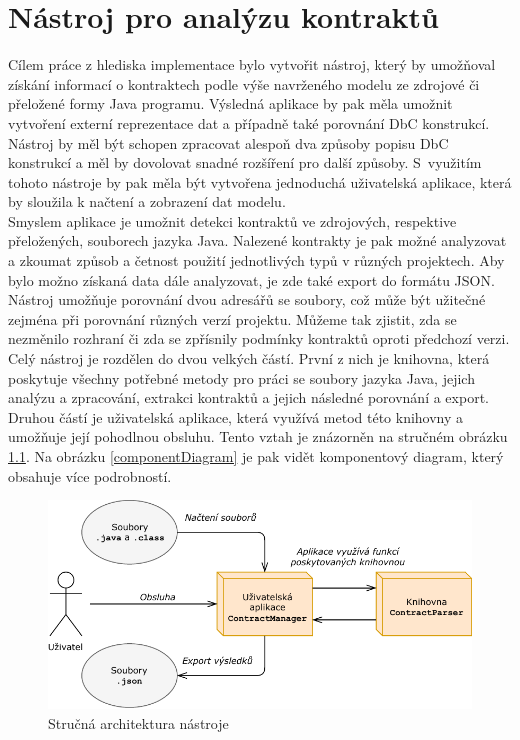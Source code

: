 \chapter{Nástroj pro analýzu kontraktů}
	Cílem práce z hlediska implementace bylo vytvořit nástroj, který by umožňoval získání informací o kontraktech podle výše navrženého modelu ze zdrojové či přeložené formy Java programu. Výsledná aplikace by pak měla umožnit vytvoření externí reprezentace dat a případně také porovnání DbC konstrukcí. Nástroj by měl být schopen zpracovat alespoň dva způsoby popisu DbC konstrukcí a měl by dovolovat snadné rozšíření pro další způsoby. S~využitím tohoto nástroje by pak měla být vytvořena jednoduchá uživatelská aplikace, která by sloužila k načtení a zobrazení dat modelu.\\
	
	Smyslem aplikace je umožnit detekci kontraktů ve zdrojových, respektive přeložených, souborech jazyka Java. Nalezené kontrakty je pak možné analyzovat a zkoumat způsob a četnost použití jednotlivých typů v různých projektech. Aby bylo možno získaná data dále analyzovat, je zde také export do formátu JSON. Nástroj umožňuje porovnání dvou adresářů se soubory, což může být užitečné zejména při porovnání různých verzí projektu. Můžeme tak zjistit, zda se nezměnilo rozhraní či zda se zpřísnily podmínky kontraktů oproti předchozí verzi.\\
	
	Celý nástroj je rozdělen do dvou velkých částí. První z nich je knihovna, která poskytuje všechny potřebné metody pro práci se soubory jazyka Java, jejich analýzu a zpracování, extrakci kontraktů a jejich následné porovnání a export. Druhou částí je uživatelská aplikace, která využívá metod této knihovny a umožňuje její pohodlnou obsluhu. Tento vztah je znázorněn na stručném obrázku \ref{globalArchitecture}. Na obrázku \ref{componentDiagram} je pak vidět komponentový diagram, který obsahuje více podrobností.
					
	\begin{figure}[!htb]
			\centering
			\includegraphics{img/globalArchitecture.pdf}
			\caption[globalArchitecture]{Stručná architektura nástroje}
			\label{globalArchitecture}
		\endminipage\hfill
	\end{figure}
	
